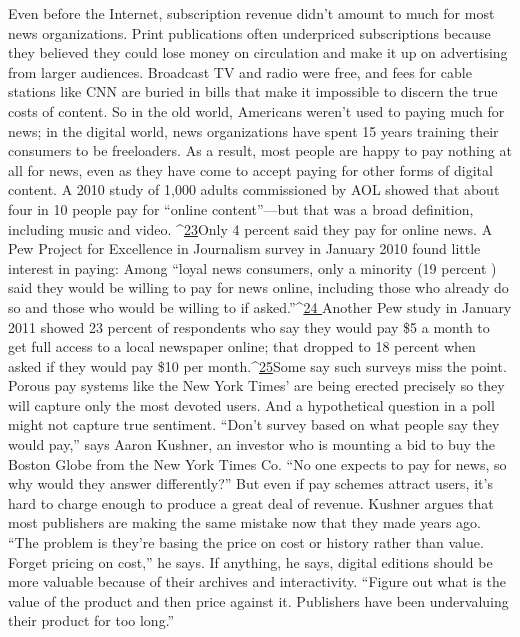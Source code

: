Even before the Internet, subscription revenue didn’t amount to much for
most news organizations. Print publications often underpriced subscriptions because
they believed they could lose money on circulation and make it up on
advertising from larger audiences. Broadcast TV and radio were free, and fees
for cable stations like CNN are buried in bills that make it impossible to discern
the true costs of content. So in the old world, Americans weren’t used to paying
much for news; in the digital world, news organizations have spent 15 years training
their consumers to be freeloaders.
As a result, most people are happy to pay nothing at all for news, even as they
have come to accept paying for other forms of digital content. A 2010 study of
1,000 adults commissioned by AOL showed that about four in 10 people pay for
``online content''—but that was a broad definition, including music and video. ^{\href{#endnotes-ch5}{23}}Only 4 percent said they pay for online news. A Pew Project for Excellence in
Journalism survey in January 2010 found little interest in paying: Among ``loyal
news consumers, only a minority (19 percent ) said they would be willing to
pay for news online, including those who already do so and those who would
be willing to if asked.''^{\href{#endnotes-ch5}{24 }}Another Pew study in January 2011 showed 23 percent
of respondents who say they would pay \$5 a month to get full access to a local
newspaper online; that dropped to 18 percent when asked if they would pay \$10
per month.^{\href{#endnotes-ch5}{25}}Some say such surveys miss the point. Porous pay systems like the New York
Times’ are being erected precisely so they will capture only the most devoted users.
And a hypothetical question in a poll might not capture true sentiment. ``Don’t
survey based on what people say they would pay,'' says Aaron Kushner, an investor
who is mounting a bid to buy the Boston Globe from the New York Times Co.
``No one expects to pay for news, so why would they answer differently?''
But even if pay schemes attract users, it’s hard to charge enough to produce a
great deal of revenue. Kushner argues that most publishers are making the same
mistake now that they made years ago. ``The problem is they’re basing the price
on cost or history rather than value. Forget pricing on cost,'' he says. If anything,
he says, digital editions should be more valuable because of their archives and
interactivity. ``Figure out what is the value of the product and then price against
it. Publishers have been undervaluing their product for too long.''
